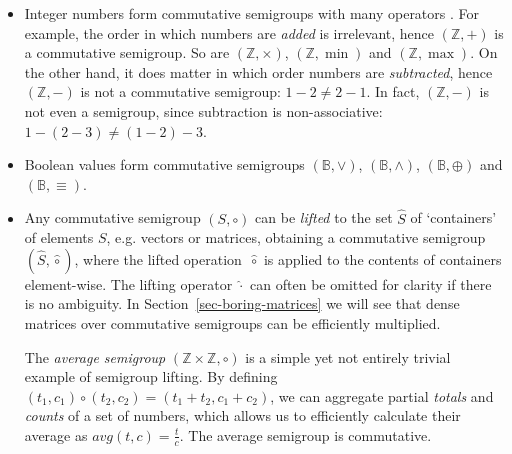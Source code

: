 \begin{itemize}
  \item Integer numbers form commutative semigroups with many operators
  {}. For
  example, the order in which numbers are \emph{added} is irrelevant, hence
  $(\mathbb{Z}, +)$ is a commutative semigroup. So are $(\mathbb{Z}, \times)$,
  $(\mathbb{Z}, \min)$ and $(\mathbb{Z}, \max)$. On the other hand, it does
  matter in which order numbers are \emph{subtracted}, hence $(\mathbb{Z}, -)$
  is not a commutative semigroup: $1-2 \neq 2-1$. In fact, $(\mathbb{Z}, -)$
  is not even a semigroup, since subtraction is non-associative:
  $1-(2-3) \neq (1-2)-3$.

  \item Boolean values form commutative semigroups $(\mathbb{B}, \vee)$,
  $(\mathbb{B}, \wedge)$, $(\mathbb{B}, \oplus)$ and $(\mathbb{B}, \equiv)$.

  \item Any commutative semigroup $(S, \circ)$ can be \emph{lifted} to the set
  $\hat{S}$ of `containers' of elements $S$, e.g. vectors or matrices,
  obtaining a commutative semigroup $(\hat{S}, \hat{\circ})$, where the lifted
  operation~$\hat{\circ}$ is applied to the contents of containers element-wise.
  The lifting operator $\hat{\cdot}$
  {} 
  can often be omitted for clarity if there
  is no ambiguity. In Section~\ref{sec-boring-matrices} we will see that dense
  matrices over commutative semigroups can be efficiently multiplied.

  The \emph{average semigroup} $(\mathbb{Z} \times \mathbb{Z}, \circ)$ is a
  simple yet not entirely trivial example of semigroup lifting. By defining
  $(t_1, c_1) \circ (t_2, c_2) = (t_1 + t_2, c_1 + c_2)$, we can aggregate
  partial \emph{totals} and \emph{counts} of a set of numbers, which allows us
  to efficiently calculate their average as $\textit{avg}(t, c) = \frac{t}{c}$.
  The average semigroup is commutative.


\end{itemize}

